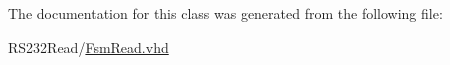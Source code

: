 \subsubsection[{std\+\_\+logic\+\_\+1164}]{\hspace{0.3cm}{\ttfamily [Package]}}\label{class_f_s_m_read_acd03516902501cd1c7296a98e22c6fcb}


The documentation for this class was generated from the following file\+:\begin{DoxyCompactItemize}
\item 
R\+S232\+Read/\hyperlink{_fsm_read_8vhd}{Fsm\+Read.\+vhd}\end{DoxyCompactItemize}
